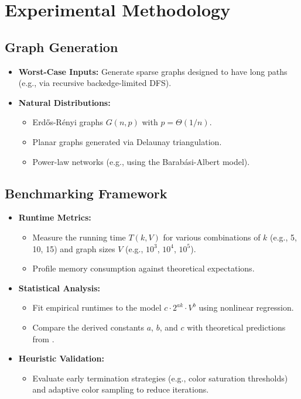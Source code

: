 \section{Experimental Methodology}
\subsection{Graph Generation}
\begin{itemize}
    \item \textbf{Worst-Case Inputs:} Generate sparse graphs designed to have long paths (e.g., via recursive backedge-limited DFS).
    \item \textbf{Natural Distributions:}
    \begin{itemize}
        \item Erd\H{o}s-R\'enyi graphs \(G(n,p)\) with \(p=\Theta(1/n)\).
        \item Planar graphs generated via Delaunay triangulation.
        \item Power-law networks (e.g., using the Barab\'asi-Albert model).
    \end{itemize}
\end{itemize}

\subsection{Benchmarking Framework}
\begin{itemize}
    \item \textbf{Runtime Metrics:}  
    \begin{itemize}
        \item Measure the running time \(T(k,V)\) for various combinations of \(k\) (e.g., 5, 10, 15) and graph sizes \(V\) (e.g., \(10^3\), \(10^4\), \(10^5\)).
        \item Profile memory consumption against theoretical expectations.
    \end{itemize}
    \item \textbf{Statistical Analysis:}  
    \begin{itemize}
        \item Fit empirical runtimes to the model \( c \cdot 2^{a k} \cdot V^b \) using nonlinear regression.
        \item Compare the derived constants \(a\), \(b\), and \(c\) with theoretical predictions from \cite{alon1995color}.
    \end{itemize}
    \item \textbf{Heuristic Validation:}
    \begin{itemize}
        \item Evaluate early termination strategies (e.g., color saturation thresholds) and adaptive color sampling to reduce iterations.
    \end{itemize}
\end{itemize}



